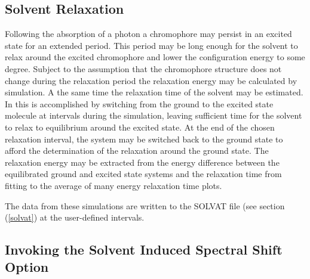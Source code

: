\subsection{Solvent Relaxation}
\label{switching}
Following the absorption of a photon a chromophore may persist in an excited
state for an extended period. This period may be long enough for the solvent
to relax around the excited chromophore and lower the configuration energy to
some degree. Subject to the assumption that the chromophore structure does not
change during the relaxation period the relaxation energy may be calculated by
simulation. A the same time the relaxation time of the solvent may be
estimated. In \D{} this is accomplished by switching from the ground to the
excited state molecule at intervals during the simulation, leaving sufficient
time for the solvent to relax to equilibrium around the excited state. At the
end of the chosen relaxation interval, the system may be switched back to the
ground state to afford the determination of the relaxation around the ground
state. The relaxation energy may be
extracted from the energy difference between the equilibrated ground and
excited state systems and the relaxation time from fitting to the average of
many energy relaxation time plots.

The data from these simulations are written to the SOLVAT file (see section
(\ref{solvat}) at the user-defined intervals.

\subsection{Invoking the Solvent Induced Spectral Shift Option}

